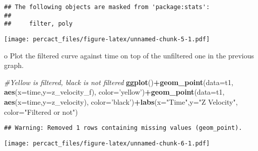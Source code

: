 \documentclass[
]{article}
\newenvironment{Shaded}{\begin{snugshade}}{\end{snugshade}}
\newcommand{\CommentTok}[1]{\textcolor[rgb]{0.56,0.35,0.01}{\textit{#1}}}
\newcommand{\DataTypeTok}[1]{\textcolor[rgb]{0.13,0.29,0.53}{#1}}
\newcommand{\DecValTok}[1]{\textcolor[rgb]{0.00,0.00,0.81}{#1}}
\newcommand{\FloatTok}[1]{\textcolor[rgb]{0.00,0.00,0.81}{#1}}
\newcommand{\KeywordTok}[1]{\textcolor[rgb]{0.13,0.29,0.53}{\textbf{#1}}}
\newcommand{\NormalTok}[1]{#1}
\newcommand{\OperatorTok}[1]{\textcolor[rgb]{0.81,0.36,0.00}{\textbf{#1}}}
\newcommand{\StringTok}[1]{\textcolor[rgb]{0.31,0.60,0.02}{#1}}
\begin{document}
\begin{verbatim}
## The following objects are masked from 'package:stats':
## 
##     filter, poly
\end{verbatim}

\begin{Shaded}
\end{Shaded}

\texttt{[image: percact\_files/figure-latex/unnamed-chunk-5-1.pdf]}

o Plot the filtered curve against time on top of the unfiltered one in
the previous graph.

\begin{Shaded}
\begin{Highlighting}[]
\CommentTok{#Yellow is filtered, black is not filtered}
\KeywordTok{ggplot}\NormalTok{()}\OperatorTok{+}\KeywordTok{geom_point}\NormalTok{(}\DataTypeTok{data=}\NormalTok{t1, }\KeywordTok{aes}\NormalTok{(}\DataTypeTok{x=}\NormalTok{time,}\DataTypeTok{y=}\NormalTok{z_velocity_f), }\DataTypeTok{color=}\StringTok{'yellow'}\NormalTok{)}\OperatorTok{+}\KeywordTok{geom_point}\NormalTok{(}\DataTypeTok{data=}\NormalTok{t1, }\KeywordTok{aes}\NormalTok{(}\DataTypeTok{x=}\NormalTok{time,}\DataTypeTok{y=}\NormalTok{z_velocity), }\DataTypeTok{color=}\StringTok{'black'}\NormalTok{)}\OperatorTok{+}\KeywordTok{labs}\NormalTok{(}\DataTypeTok{x=}\StringTok{"Time"}\NormalTok{,}\DataTypeTok{y=}\StringTok{"Z Velocity"}\NormalTok{, }\DataTypeTok{color=}\StringTok{"Filtered or not"}\NormalTok{)}
\end{Highlighting}
\end{Shaded}

\begin{verbatim}
## Warning: Removed 1 rows containing missing values (geom_point).
\end{verbatim}

\texttt{[image: percact\_files/figure-latex/unnamed-chunk-6-1.pdf]}
\end{document}
